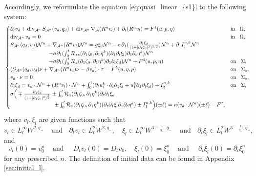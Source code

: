 \documentclass[letterpaper,reqno,10pt,twoside]{amsart}
\theoremstyle{definition}
\theoremstyle{remark}
\def\p{\partial}
\def\dive{\mathop{\rm div}\nolimits}
\begin{document}
	Accordingly, we reformulate the equation \eqref{eq:quasi_linear_{s1}} to the following system:
	\begin{equation}{\label{eq:quasi_linear_{sk}}}
		\begin{cases}
			\partial_{t}v_{d}+\operatorname{div}_{\mathcal{A}^{n}}S_{\mathcal{A}^{n}}(v_{d},q_{d})+\dive_{\mathcal{A}^{n}}\nabla_{\mathcal{A}}(R^{n}v_{l})+\p_{t}(R^{n}v_{l})=F^{1}(u,p,\eta)~~~&\operatorname{in}~~\Omega,\\
			\operatorname{div}_{\mathcal{A}^{n}}v_{d}=0~~~&\operatorname{in}~~\Omega,\\
			S_{\mathcal{A}^{n}}(q_{d},v_{d})\mathcal{N}^{n}+\nabla_{\mathcal{A}^{n}}(R^{n}v_{l})\mathcal{N}^{n}=g\xi_{d}\mathcal{N}^{n}-\sigma\partial_{1}(\frac{\p_1\xi_d}{(1+\vert \partial_{1}\zeta_{0}\vert^{2})^{3/2}})\mathcal{N}^{n}+\p_{1}I^{n,k}_{1}\mathcal{N}^{n}\\
			\quad\quad\quad\quad\quad\quad\quad+\sigma\partial_{1}(\int_{0}^{t}\mathcal{R}_{zz}(\partial_{1}\zeta_{0},\partial_{1}\eta^{k})(\partial_{1}\p_{t}\xi_{l})\p_{1}\p_{t}\eta^{k})\mathcal{N}^{n}\\
			\quad\quad\quad\quad\quad\quad\quad +\sigma\partial_{1}(\int_{0}^{t}\mathcal{R}_{z}(\partial_{1}\zeta_{0},\partial_{1}\eta^{k})\partial_{1}\partial_{t}\xi_{d})\mathcal{N}^{n}+F^{4}(u,p,\eta)~~~&\operatorname{on}~~\Sigma,\\
			(S_{\mathcal{A}^{n}}(q_{d},v_{d})\nu+\nabla_{\mathcal{A}^{n}}(R^{n}v_{l})\nu-\beta v_{d})\cdot \tau=F^{5}(u,\eta,p)~~~&\operatorname{on}~~\Sigma_{s},\\
			v_{d}\cdot \nu=0~~~&\operatorname{on}~~\Sigma_{s},\\
			\partial_{t}\xi_{d}=v_{d}\cdot \mathcal{N}^{n}+(R^{n}v_{l})\cdot \mathcal{N}^{n}+\int_{0}^{t}(\partial_{t}u_{1}^{k}\cdot\partial_{t}\p_{1}\xi_{l}+u_{1}^{k}\partial_{1}\partial_{t}\xi_{d})+I^{n,k}_{2}~~~&\operatorname{on}~~\Sigma,\\
			\sigma \Big(\mp \frac{\partial_{1}\xi_{d}}{(1+\vert \partial_{1}\zeta_{0}\vert^{2})^{\frac{3}{2}}}\pm \int_{0}^{t}\mathcal{R}_{z}(\partial_{1}\zeta_{0},\partial_{1}\eta^{k})\partial_{t}\partial_{1}\xi_{d}\\
			\quad\quad\quad\quad\quad\quad\quad\quad \pm\int_{0}^{t}\mathcal{R}_{z}(\p_{1}\zeta_{0},\p_{1}\eta^{k})(\p_{t}\p_{1}\xi_{l}\p_{1}\p_{t}\eta^{k})\pm I^{n,k}_{1} \Big) (\pm \ell)=\kappa (v_{d}\cdot \mathcal{N}^{n})(\pm \ell)-{F}^{7},
		\end{cases}
	\end{equation}
	where $v_{l},\xi_{l}$ are given functions such that
	\[
	v_{l}\in L_{t}^{\infty}W^{2,q_{-}}~~~~\operatorname{and}~~~\p_{t}v_{l}\in L_{t}^{2}W^{2,q_{-}},\quad
	\xi_{l}\in L_{t}^{\infty}W^{3-\frac{1}{q_{-}},q_{-}}~~~~\operatorname{and}~~~\p_{t}\xi_{l}\in L_{t}^{2}W^{3-\frac{1}{q_{-}},q_{-}},
	\]
	and
	\[
	v_{l}(0)=v_{0}^{n}~~~~\operatorname{and}~~~~~D_{t}v_{l}(0)=D_{t}v_{0},\quad
	\xi_{l}(0)=\xi_{0}^{n}~~~~\operatorname{and}~~~~~\p_{t}\xi_{l}(0)=\p_{t}\xi_{0}^{n}
	\]
	\noindent for any prescribed $n$. The definition of initial data can be found in Appendix \ref{sec:initial_l}.
	
\end{document}
